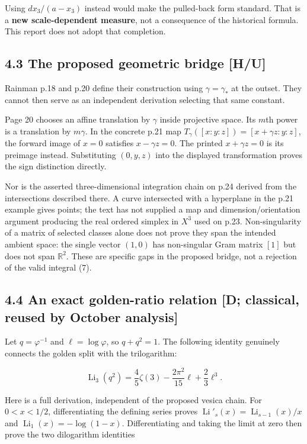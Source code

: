 \documentclass[11pt,a4paper]{article}
\begin{document}
Using $dx_3/(a-x_3)$ instead would make the pulled-back form standard. That is a \textbf{new scale-dependent measure}, not a consequence of the historical formula. This report does not adopt that completion.


\subsection*{4.3 The proposed geometric bridge [H/U]}

Rainman p.18 and p.20 define their construction using $\gamma=\gamma_*$ at the outset. They cannot then serve as an independent derivation selecting that same constant.


Page 20 chooses an affine translation by $\gamma$ inside projective space. Its $m$th power is a translation by $m\gamma$. In the concrete p.21 map
$T_\gamma([x:y:z])=[x+\gamma z:y:z]$, the forward image of $x=0$ satisfies $x-\gamma z=0$. The printed $x+\gamma z=0$ is its preimage instead. Substituting $(0,y,z)$ into the displayed transformation proves the sign distinction directly.


Nor is the asserted three-dimensional integration chain on p.24 derived from the intersections described there. A curve intersected with a hyperplane in the p.21 example gives points; the text has not supplied a map and dimension/orientation argument producing the real ordered simplex in $X^3$ used on p.23. Non-singularity of a matrix of selected classes alone does not prove they span the intended ambient space: the single vector $(1,0)$ has non-singular Gram matrix $[1]$ but does not span $\mathbb R^2$. These are specific gaps in the proposed bridge, not a rejection of the valid integral (7).


\subsection*{4.4 An exact golden-ratio relation [D; classical, reused by October analysis]}

Let $q=\varphi^{-1}$ and $\ell=\log\varphi$, so $q+q^2=1$. The following identity genuinely connects the golden split with the trilogarithm:


\[
\operatorname{Li}_3(q^2)=
\frac45\zeta(3)-\frac{2\pi^2}{15}\ell+\frac23\ell^3. \tag{9}
\]

Here is a full derivation, independent of the proposed vesica chain. For $0<x<1/2$, differentiating the defining series proves
$\operatorname{Li}'_s(x)=\operatorname{Li}_{s-1}(x)/x$ and $\operatorname{Li}_1(x)=-\log(1-x)$. Differentiating and taking the limit at zero then prove the two dilogarithm identities
\end{document}
